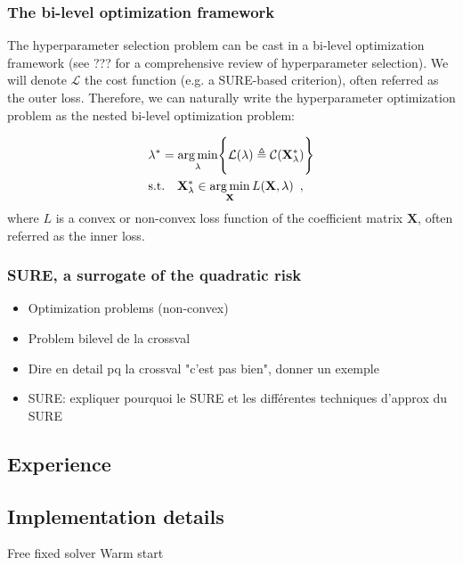 \subsubsection{The bi-level optimization framework}

The hyperparameter selection problem can be cast in a bi-level optimization framework (see ???
for a comprehensive review of hyperparameter selection). We will denote $\mathcal{L}$ the cost function
(e.g. a SURE-based criterion), often referred as the outer loss. Therefore, we can naturally write
the hyperparameter optimization problem as the nested bi-level optimization problem:

\begin{align*}
    &\lambda^* = \operatorname*{arg\,min}_{\lambda} 
    \Biggl\{
        \mathcal{L}(\lambda) 
        \triangleq 
        \mathcal{C}(\mathbf{X}_{\lambda}^*)
    \Biggr\} \\
    &\text{s.t.} \quad 
    \mathbf{X}_{\lambda}^* 
    \in 
    \operatorname*{arg\,min}_{\mathbf{X}} L(\mathbf{X}, \lambda)
    \enspace ,
\end{align*}
%
where $L$ is a convex or non-convex loss function of the coefficient matrix $\mathbf{X}$, 
often referred as the inner loss.

\subsubsection{SURE, a surrogate of the quadratic risk}

\begin{itemize}
    \item Optimization problems (non-convex)
    \item Problem bilevel de la crossval
    \item Dire en detail pq la crossval "c'est pas bien", donner un exemple
    \item SURE: expliquer pourquoi le SURE et les différentes techniques d'approx du SURE
\end{itemize}
%
%
%
%
\subsection{Experience}
\label{sub:experience}
%

\subsection{Implementation details}
\label{sub:experience}
%
Free fixed solver
Warm start

\clearpage

